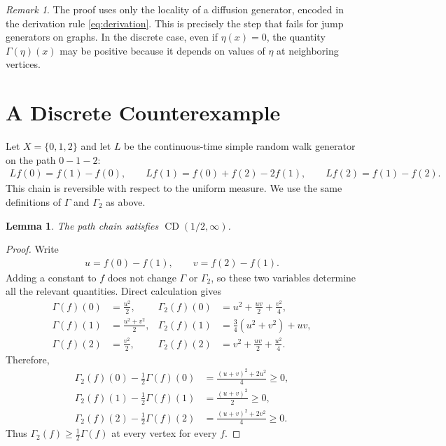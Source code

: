 \documentclass[11pt]{article}
\theoremstyle{plain}
\newtheorem{lemma}[theorem]{Lemma}
\theoremstyle{definition}
\theoremstyle{remark}
\newtheorem{remark}[theorem]{Remark}
\begin{document}
\begin{remark}
The proof uses only the locality of a diffusion generator, encoded in the
derivation rule \eqref{eq:derivation}. This is precisely the step that fails
for jump generators on graphs. In the discrete case, even if
$\eta(x)=0$, the quantity $\Gamma(\eta)(x)$ may be positive because it depends
on values of $\eta$ at neighboring vertices.
\end{remark}

\section{A Discrete Counterexample}

Let $X=\{0,1,2\}$ and let $L$ be the continuous-time simple random walk generator on the path $0-1-2$:
\begin{align*}
    Lf(0)=f(1)-f(0),\qquad
    Lf(1)=f(0)+f(2)-2f(1),\qquad
    Lf(2)=f(1)-f(2).
\end{align*}
This chain is reversible with respect to the uniform measure. We use the same definitions of $\Gamma$ and $\Gamma_2$ as above.

\begin{lemma}
The path chain satisfies $\operatorname{CD}(1/2,\infty)$.
\end{lemma}

\begin{proof}
Write
\begin{align*}
    u=f(0)-f(1),\qquad v=f(2)-f(1).
\end{align*}
Adding a constant to $f$ does not change $\Gamma$ or $\Gamma_2$, so these two variables determine all the relevant quantities. Direct calculation gives
\begin{align*}
    \Gamma(f)(0)&=\frac{u^2}{2},
    &
    \Gamma_2(f)(0)&=u^2+\frac{uv}{2}+\frac{v^2}{4},
    \\
    \Gamma(f)(1)&=\frac{u^2+v^2}{2},
    &
    \Gamma_2(f)(1)&=\frac{3}{4}(u^2+v^2)+uv,
    \\
    \Gamma(f)(2)&=\frac{v^2}{2},
    &
    \Gamma_2(f)(2)&=v^2+\frac{uv}{2}+\frac{u^2}{4}.
\end{align*}
Therefore,
\begin{align*}
    \Gamma_2(f)(0)-\frac{1}{2}\Gamma(f)(0)
    &=
    \frac{(u+v)^2+2u^2}{4}
    \ge 0,\\
    \Gamma_2(f)(1)-\frac{1}{2}\Gamma(f)(1)
    &=
    \frac{(u+v)^2}{2}
    \ge 0,\\
    \Gamma_2(f)(2)-\frac{1}{2}\Gamma(f)(2)
    &=
    \frac{(u+v)^2+2v^2}{4}
    \ge 0.
\end{align*}
Thus $\Gamma_2(f)\ge \frac12 \Gamma(f)$ at every vertex for every $f$.
\end{proof}
\end{document}
